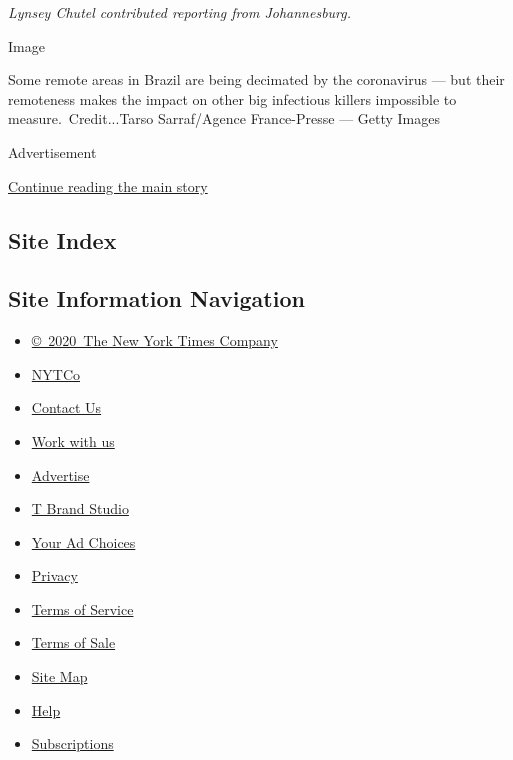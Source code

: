 \emph{Lynsey Chutel contributed reporting from Johannesburg.}

Image

Some remote areas in Brazil are being decimated by the coronavirus ---
but their remoteness makes the impact on other big infectious killers
impossible to measure.~Credit...Tarso Sarraf/Agence France-Presse ---
Getty Images

Advertisement

\protect\hyperlink{after-bottom}{Continue reading the main story}

\hypertarget{site-index}{%
\subsection{Site Index}\label{site-index}}

\hypertarget{site-information-navigation}{%
\subsection{Site Information
Navigation}\label{site-information-navigation}}

\begin{itemize}
\tightlist
\item
  \href{https://help.nytimes.com/hc/en-us/articles/115014792127-Copyright-notice}{©~2020~The
  New York Times Company}
\end{itemize}

\begin{itemize}
\tightlist
\item
  \href{https://www.nytco.com/}{NYTCo}
\item
  \href{https://help.nytimes.com/hc/en-us/articles/115015385887-Contact-Us}{Contact
  Us}
\item
  \href{https://www.nytco.com/careers/}{Work with us}
\item
  \href{https://nytmediakit.com/}{Advertise}
\item
  \href{http://www.tbrandstudio.com/}{T Brand Studio}
\item
  \href{https://www.nytimes.com/privacy/cookie-policy\#how-do-i-manage-trackers}{Your
  Ad Choices}
\item
  \href{https://www.nytimes.com/privacy}{Privacy}
\item
  \href{https://help.nytimes.com/hc/en-us/articles/115014893428-Terms-of-service}{Terms
  of Service}
\item
  \href{https://help.nytimes.com/hc/en-us/articles/115014893968-Terms-of-sale}{Terms
  of Sale}
\item
  \href{https://spiderbites.nytimes.com}{Site Map}
\item
  \href{https://help.nytimes.com/hc/en-us}{Help}
\item
  \href{https://www.nytimes.com/subscription?campaignId=37WXW}{Subscriptions}
\end{itemize}
